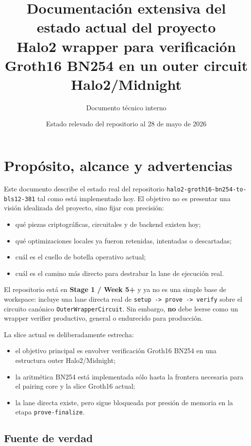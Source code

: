 \documentclass[11pt,a4paper]{article}
\title{Documentaci\'on extensiva del estado actual del proyecto\\
\large Halo2 wrapper para verificaci\'on Groth16 BN254 en un outer circuit Halo2/Midnight}
\author{Documento t\'ecnico interno}
\date{Estado relevado del repositorio al 28 de mayo de 2026}
\begin{document}
\maketitle
\tableofcontents
\newpage

\section{Prop\'osito, alcance y advertencias}

Este documento describe el estado real del repositorio \texttt{halo2-groth16-bn254-to-bls12-381}
tal como est\'a implementado hoy. El objetivo no es presentar una visi\'on idealizada del proyecto,
sino fijar con precisi\'on:

\begin{itemize}
  \item qu\'e piezas criptogr\'aficas, circuitales y de backend existen hoy;
  \item qu\'e optimizaciones locales ya fueron retenidas, intentadas o descartadas;
  \item cu\'al es el cuello de botella operativo actual;
  \item cu\'al es el camino m\'as directo para destrabar la lane de ejecuci\'on real.
\end{itemize}

El repositorio est\'a en \textbf{Stage 1 / Week 5+} y ya no es una simple base de workspace:
incluye una lane directa real de \texttt{setup -> prove -> verify} sobre el circuito can\'onico
\texttt{OuterWrapperCircuit}. Sin embargo, \textbf{no} debe leerse como un wrapper verifier
productivo, general o endurecido para producci\'on.

La slice actual es deliberadamente estrecha:

\begin{itemize}
  \item el objetivo principal es envolver verificaci\'on Groth16 BN254 en una estructura outer Halo2/Midnight;
  \item la aritm\'etica BN254 est\'a implementada s\'olo hasta la frontera necesaria para el pairing core y la slice Groth16 actual;
  \item la lane directa existe, pero sigue bloqueada por presi\'on de memoria en la etapa \texttt{prove-finalize}.
\end{itemize}

\subsection{Fuente de verdad}
\end{document}

